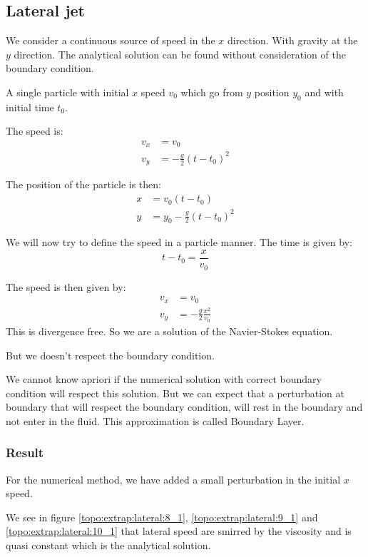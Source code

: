 \subsection{Lateral jet}

We consider a continuous source of speed in the $x$ direction. With gravity at the $y$ direction.
The analytical solution can be found without consideration of the boundary condition.

A single particle with initial $x$ speed $v_{0}$ which go from $y$ position $y_0$ and with initial time $t_0$.

The speed is:
\begin{align}
	v_{x}&=v_{0}\\
	v_{y}&=-\frac{g}{2}(t-t_0)^2
\end{align}

The position of the particle is then:
\begin{align}
	x&=v_{0}(t-t_0)\\
	y&=y_0-\frac{g}{2}(t-t_0)^2
\end{align}

We will now try to define the speed in a particle manner.
The time is given by:
\begin{equation}
	t-t_{0}=\frac{x}{v_{0}}
\end{equation}

The speed is then given by:
\begin{align}
	v_{x}&=v_{0}\\
	v_{y}&=-\frac{g}{2}\frac{x^2}{v_{0}}
\end{align}
This is divergence free.
So we are a solution of the Navier-Stokes equation.

But we doesn't respect the boundary condition.

We cannot know apriori if the numerical solution with correct boundary condition will respect this solution.
But we can expect that a perturbation at boundary that will respect the boundary condition,
will rest in the boundary and not enter in the fluid.
This approximation is called Boundary Layer.


\subsubsection{Result}


For the numerical method, we have added a small perturbation in the initial $x$ speed.

We see in figure \ref{topo:extrap:lateral:8_1}, \ref{topo:extrap:lateral:9_1} and \ref{topo:extrap:lateral:10_1} that lateral
speed are smirred by the viscosity and is quasi constant which is the analytical solution.

